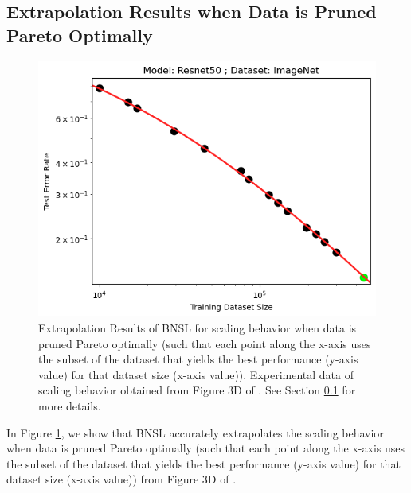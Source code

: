 \documentclass{article} %
\begin{document}
\FloatBarrier

\clearpage

\subsection{Extrapolation Results when Data is Pruned Pareto Optimally}
\label{section:data_prune}

\begin{figure}[htbp]
    \centering
\includegraphics[width=1.0\textwidth]{figures/data_prune/resnet50_imagenet.png}

    \caption{
    Extrapolation Results of BNSL for scaling behavior when data is pruned Pareto optimally (such that each point along the x-axis uses the subset of the dataset that yields the best performance (y-axis value) for that dataset size (x-axis value)). Experimental data of scaling behavior obtained from Figure 3D of \cite{https://doi.org/10.48550/arxiv.2206.14486}. See Section \ref{section:data_prune} for more details.
    }
    \label{fig:data_prune}
\end{figure}

In Figure \ref{fig:data_prune}, we show that BNSL accurately extrapolates the scaling behavior when data is pruned Pareto optimally (such that each point along the x-axis uses the subset of the dataset that yields the best performance (y-axis value) for that dataset size (x-axis value)) from Figure 3D of \cite{https://doi.org/10.48550/arxiv.2206.14486}.

\FloatBarrier
\end{document}
